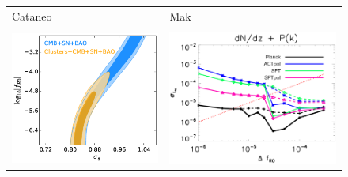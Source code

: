 \documentclass{fancyslides}
\newenvironment{typewriter}{\ttfamily}{\par}
\begin{document}
\begin{frame}
	\begin{typewriter}
	\begin{figure}
		\centering
		\begin{tabular}{@{}p{5.3cm} p{5.3cm}@{}}
			{\color{red}Cataneo} & {\color{red}Mak} \\
			 & \\
			\includegraphics[height=.42\textwidth]{Cataneo_result.png} &
			\includegraphics[height=.43\textwidth]{Mak_result.png} \\
		\end{tabular}
	\end{figure}
	\end{typewriter}
\end{frame}


\begin{frame}
\end{frame}




\end{document}
